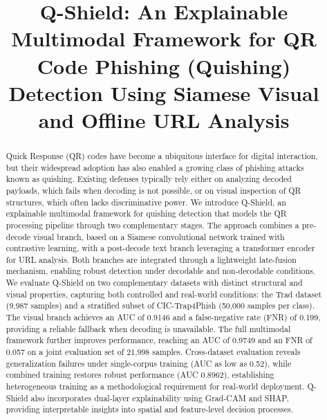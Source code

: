 \documentclass[conference]{IEEEtran}
\begin{document}
\title{Q-Shield: An Explainable Multimodal Framework for QR Code Phishing (Quishing) Detection Using Siamese Visual and Offline URL Analysis}

\author{
\and
{}
\and
{}
}

\maketitle

\begin{abstract}
Quick Response (QR) codes have become a ubiquitous interface for digital interaction, but their widespread adoption has also enabled a growing class of phishing attacks known as quishing. Existing defenses typically rely either on analyzing decoded payloads, which fails when decoding is not possible, or on visual inspection of QR structures, which often lacks discriminative power. We introduce Q-Shield, an explainable multimodal framework for quishing detection that models the QR processing pipeline through two complementary stages. The approach combines a pre-decode visual branch, based on a Siamese convolutional network trained with contrastive learning, with a post-decode text branch leveraging a transformer encoder for URL analysis. Both branches are integrated through a lightweight late-fusion mechanism, enabling robust detection under decodable and non-decodable conditions. We evaluate Q-Shield on two complementary datasets with distinct structural and visual properties, capturing both controlled and real-world conditions: the Trad dataset (9,987 samples) and a stratified subset of CIC-Trap4Phish (50,000 samples per class). The visual branch achieves an AUC of 0.9146 and a false-negative rate (FNR) of 0.199, providing a reliable fallback when decoding is unavailable. The full multimodal framework further improves performance, reaching an AUC of 0.9749 and an FNR of 0.057 on a joint evaluation set of 21,998 samples. Cross-dataset evaluation reveals generalization failures under single-corpus training (AUC as low as 0.52), while combined training restores robust performance (AUC 0.8962), establishing heterogeneous training as a methodological requirement for real-world deployment. Q-Shield also incorporates dual-layer explainability using Grad-CAM and SHAP, providing interpretable insights into spatial and feature-level decision processes.
\end{abstract}
\end{document}
